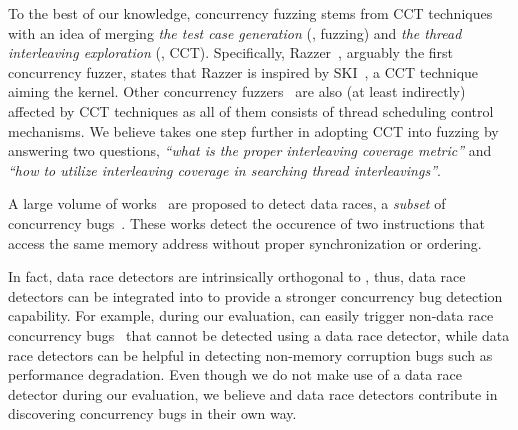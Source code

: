 To the best of our knowledge, concurrency fuzzing stems from CCT
techniques with an idea of merging \textit{the test case generation}
(\ie, fuzzing) and \textit{the thread interleaving exploration} (\ie,
CCT).
%
Specifically, Razzer~\cite{razzer}, arguably the first concurrency
fuzzer, states that Razzer is inspired by SKI~\cite{ski}, a CCT
technique aiming the kernel.
%
Other concurrency fuzzers~\cite{krace, muzz, snowboard, conzzer} are
also (at least indirectly) affected by CCT techniques as all of them
consists of thread scheduling control mechanisms.
%
We believe \sys takes one step further in adopting CCT into fuzzing by
answering two questions, \textit{``what is the proper interleaving
  coverage metric''} and \textit{``how to utilize interleaving
  coverage in searching thread interleavings''}.



%
A large volume of works~\cite{pacer, datacollider, hybridchecker,
  literace, helgrind, frost, prorace, tsan, kcsan, txrace} are
proposed to detect data races, a \textit{subset} of concurrency
bugs~\cite{lkmm, linuxmemorymodel}.
%
These works detect the occurence of two instructions that access the
same memory address without proper synchronization or ordering.

In fact, data race detectors are intrinsically orthogonal to \sys,
thus, data race detectors can be integrated into \sys to provide a
stronger concurrency bug detection capability.
%
For example, during our evaluation, \sys can easily trigger non-data
race concurrency bugs~\cite{snowboardbug, cve20196974, cve20177533}
that cannot be detected using a data race detector, while data race
detectors can be helpful in detecting non-memory corruption bugs such
as performance degradation.
%
Even though we do not make use of a data race detector during our
evaluation, we believe \sys and data race detectors contribute in
discovering concurrency bugs in their own way.





